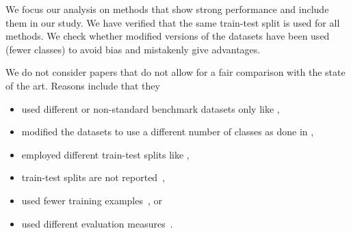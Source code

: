 We focus our analysis on methods that show strong performance and include them in our study.
We have verified that the same train-test split is used for all methods.
We check whether modified versions of the datasets have been used (\eg fewer classes) to avoid bias and mistakenly give advantages.

We do not consider papers that do not allow for a fair comparison with the state of the art.
Reasons include that they 
\begin{itemize}
\item used different or non-standard benchmark datasets only like \cite{
petridis2024textclassificationneuralnetworks,
peng2025text,
petridis2024textclassificationneuralnetworks,
DBLP:journals/nca/JiaJDZLXC23-mhgat,
10748883-boing-aviation-paper,
LMTCSG-10705790,
AGBESI2024e38515,
10.1007/978-3-031-72350-6_20,
DBLP:journals/corr/abs-2408-15650,
Wei_Sun_2024,
DBLP:conf/kdd/Yu00S24,
DBLP:conf/sigir/DaiYCX24, 
DBLP:journals/corr/abs-2403-03293, 
10.1016/j.datak.2024.102306,
DBLP:journals/access/ThaminkaewLV24,
DBLP:journals/tkde/HuLZHNL24,
DBLP:conf/coling/LyKCK24,
JAMSHIDI2024102306,
DBLP:journals/corr/abs-2401-01667-MLP-Compass,
thaminkaew2024ieeeaccess,
li2023chatgpt,yu2023open,yuan2023revisiting,
zhu2023,
chae_davidson_2023,
zhang2023pretraining,
Yang-ClimateChangeClassifiert-2023,
DBLP:journals/apin/TanRW23,
bgnn-xml,
DBLP:conf/ijcnn/TranSZPB22,
LiuEtAl2022-LongText,
DBLP:conf/aiia/BreazzanoC021a,
DBLP:journals/corr/abs-2206-07253,
DBLP:journals/corr/abs-2112-11389,
chalkidis-etal-2020-empirical,
DBLP:conf/eacl/SchwenkBCL17,gururangan-etal-2019-variational},

\item modified the datasets to use a different number of classes as done in \cite{DBLP:conf/coling/ZhouQZXBX16,DBLP:conf/aaai/LaiXLZ15,MTAPparlakNovelFeatureClassbased2023},

\item employed different train-test splits like
\cite{
donabauer2024tokenlevelgraphsshorttext,
DBLP:journals/eswa/ReusensSTSVBB24,
edwards2024language,
StylianouEtAl2023,
DBLP:journals/corr/abs-2211-02563,
DBLP:conf/ijcnn/SunHCYSM22,
raihan2021-survey,
DBLP:conf/icaart/PalSS20,
moreo2020,
canutoThoroughEvaluationDistanceBased2018}, 

\item train-test splits are not reported~\cite{moreo2020,sf-cnn-iasc.2023.027429,YuanEtAl-MSVM-kNN-2008},

\item used fewer training examples~\cite{
DBLP:conf/acl/LiangZ0Z24,
DBLP:conf/aaai/LiuZ0ZWMCYZ24,
Xie2024DataLT,
zhu2023,
duarte2023review,
DBLP:journals/corr/abs-2301-10481,
DBLP:conf/emnlp/ZhengWYD22,
DBLP:conf/ijcnn/SunHCYSM22,DBLP:conf/emnlp/WangWYD21}, 
or

\item used different evaluation measures~\cite{tan2022,DBLP:conf/emnlp/HuangGKOO21}.

\end{itemize}

